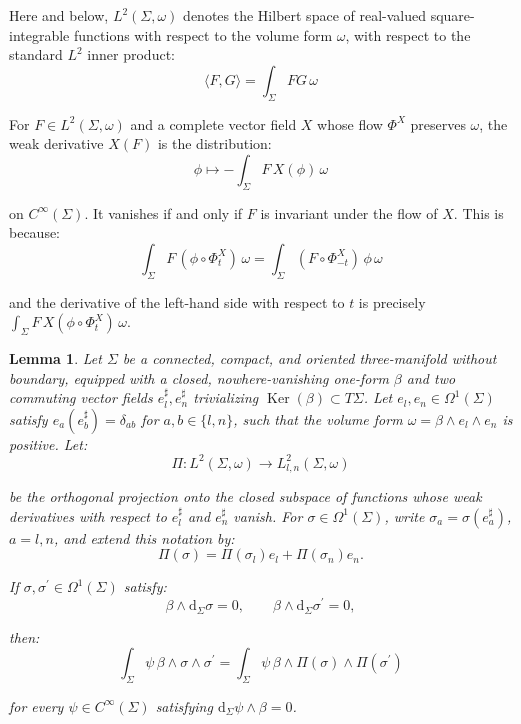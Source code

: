 \documentclass[10pt,reqno,a4paper]{amsart}
\theoremstyle{plain}
\newtheorem{lemma}[thm]{Lemma}
\theoremstyle{definition}
\theoremstyle{remark}
\theoremstyle{remark}
\def\dd{\mathrm{d}}
\newcommand{\Ker}{\operatorname{Ker}}
\renewcommand{\(}{ (}
\renewcommand{\)}{ )}
\begin{document}
\noindent
Here and below, $L^2(\Sigma,\omega)$ denotes the Hilbert space of real-valued square-integrable functions with respect to the volume form $\omega$, with respect to the standard $L^2$ inner product: 
\begin{equation*}
\langle F,G\rangle=\int_{\Sigma}FG\,\omega    
\end{equation*}

\noindent
For $F\in L^2(\Sigma,\omega)$ and a complete vector field $X$ whose flow $\Phi^X$ preserves $\omega$, the weak derivative $X(F)$ is the distribution:
\begin{equation*}
 \phi\mapsto -\int_{\Sigma}F\,X(\phi)\,\omega   
\end{equation*}

\noindent
on $C^{\infty}(\Sigma)$. It vanishes if and only if $F$ is invariant under the flow of $X$. This is because:
\begin{equation*}
\int_{\Sigma}F\,(\phi\circ\Phi^X_t)\,\omega=\int_{\Sigma}(F\circ\Phi^X_{-t})\,\phi\,\omega    
\end{equation*}

\noindent
and the derivative of the left-hand side with respect to $t$ is precisely $\int_{\Sigma}F\,X(\phi\circ\Phi^X_t)\,\omega$.

\begin{lemma}
\label{lemma:leafwiseaveraging}
Let $\Sigma$ be a connected, compact, and oriented three-manifold without boundary, equipped with a closed, nowhere-vanishing one-form $\beta$ and two commuting vector fields $e_l^{\sharp},e_n^{\sharp}$ trivializing $\Ker(\beta) \subset T\Sigma$. Let $e_l,e_n\in\Omega^1(\Sigma)$ satisfy $e_a(e^{\sharp}_b)=\delta_{ab}$ for $a,b\in\{l,n\}$, such that the volume form $\omega=\beta\wedge e_l\wedge e_n$ is positive. Let:
\begin{equation*}
\Pi\colon L^2(\Sigma,\omega)\longrightarrow L^2_{l,n}(\Sigma,\omega)
\end{equation*}
	
\noindent
be the orthogonal projection onto the closed subspace of functions whose weak derivatives with respect to $e_l^{\sharp}$ and $e_n^{\sharp}$ vanish. For $\sigma\in\Omega^1(\Sigma)$, write $\sigma_a=\sigma(e_a^{\sharp})$, $a=l,n$, and extend this notation by:
\begin{equation*}
\Pi(\sigma)=\Pi(\sigma_l)e_l+\Pi(\sigma_n)e_n.
\end{equation*}
	
\noindent
If $\sigma,\sigma^{\prime}\in\Omega^1(\Sigma)$ satisfy:
\begin{equation*}
\beta\wedge\dd_{\Sigma}\sigma=0, \qquad \beta\wedge\dd_{\Sigma} \sigma^{\prime} =0,
\end{equation*}
	
\noindent
then:
\begin{equation}
\label{eq:leafwiseaveraging}
\int_{\Sigma}\psi\,\beta\wedge\sigma\wedge\sigma^{\prime} =
\int_{\Sigma}\psi\,\beta\wedge\Pi(\sigma)\wedge\Pi(\sigma^{\prime})
\end{equation}
	
\noindent
for every $\psi\in C^{\infty}(\Sigma)$ satisfying $\dd_{\Sigma}\psi \wedge \beta=0$.  
\end{lemma}
\end{document}
